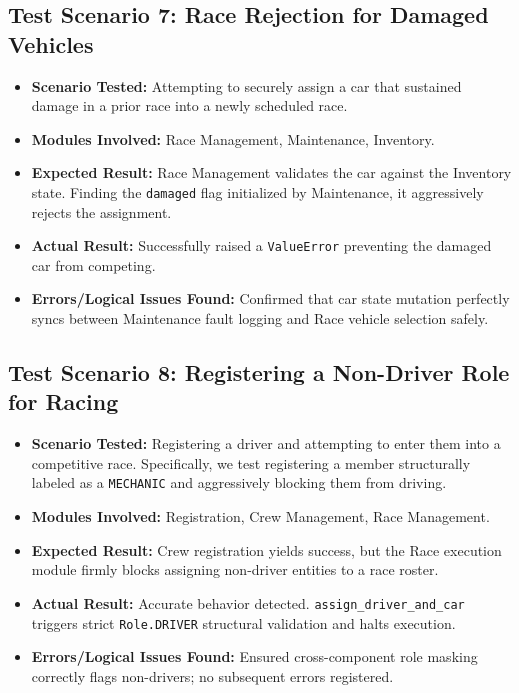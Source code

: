 \documentclass[12pt,a4paper]{article}
\begin{document}
\subsection{Test Scenario 7: Race Rejection for Damaged Vehicles}
\begin{itemize}
    \item \textbf{Scenario Tested:} Attempting to securely assign a car that sustained damage in a prior race into a newly scheduled race.
    \item \textbf{Modules Involved:} Race Management, Maintenance, Inventory.
    \item \textbf{Expected Result:} Race Management validates the car against the Inventory state. Finding the \texttt{damaged} flag initialized by Maintenance, it aggressively rejects the assignment.
    \item \textbf{Actual Result:} Successfully raised a \texttt{ValueError} preventing the damaged car from competing.
    \item \textbf{Errors/Logical Issues Found:} Confirmed that car state mutation perfectly syncs between Maintenance fault logging and Race vehicle selection safely.
\end{itemize}

\subsection{Test Scenario 8: Registering a Non-Driver Role for Racing}
\begin{itemize}
    \item \textbf{Scenario Tested:} Registering a driver and attempting to enter them into a competitive race. Specifically, we test registering a member structurally labeled as a \texttt{MECHANIC} and aggressively blocking them from driving.
    \item \textbf{Modules Involved:} Registration, Crew Management, Race Management.
    \item \textbf{Expected Result:} Crew registration yields success, but the Race execution module firmly blocks assigning non-driver entities to a race roster.
    \item \textbf{Actual Result:} Accurate behavior detected. \texttt{assign\_driver\_and\_car} triggers strict \texttt{Role.DRIVER} structural validation and halts execution.
    \item \textbf{Errors/Logical Issues Found:} Ensured cross-component role masking correctly flags non-drivers; no subsequent errors registered.
\end{itemize}
\end{document}
